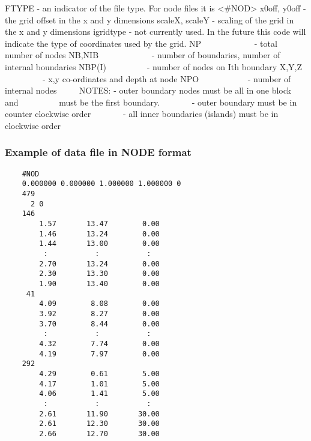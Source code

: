 \documentclass{article}
\begin{document}
\noindent
FTYPE - an indicator of the file type.  For node files it is <\#NOD> \newline
x0off, y0off - the grid offset in the x and y dimensions \newline
scaleX, scaleY - scaling of the grid in the x and y dimensions \newline
igridtype - not currently used.  In the future this code will indicate the type of coordinates used by the grid. \newline
NP \ \ \ \ \ \ \ \ \ \ \ \ {}- total number of nodes\newline
NB,NIB \ \ \ \ \ \ \ \ \ \ \ \ {}- number of boundaries, number of internal boundaries\newline
NBP(I) \ \ \ \ \ \ \ \ \ {}- number of nodes on Ith boundary\newline
X,Y,Z \ \ \ \ \ \ \ \ \ {}- x,y co-ordinates and depth at node\newline
NPO \ \ \ \ \ \ \ \ \ \ \ {}- number of internal nodes\newline
 \ \ \ \ \newline
 NOTES: - outer boundary nodes must be all in one block and\newline
 \ \ \ \ \ \ \ \ \ must be the first boundary.\newline
 \ \ \ \ \ \ \ {}- outer boundary must be in counter clockwise order\newline
 \ \ \ \ \ \ \ {}- all inner boundaries (islands) must be in clockwise order


\newpage
\subsubsection{Example of data file in NODE format}

\begin{small}
\begin{lstlisting}
    #NOD 
    0.000000 0.000000 1.000000 1.000000 0 
    479
      2 0
    146
        1.57       13.47        0.00
        1.46       13.24        0.00
        1.44       13.00        0.00
         :           :           :
        2.70       13.24        0.00
        2.30       13.30        0.00
        1.90       13.40        0.00
     41
        4.09        8.08        0.00
        3.92        8.27        0.00
        3.70        8.44        0.00
         :           :           :
        4.32        7.74        0.00
        4.19        7.97        0.00
    292
        4.29        0.61        5.00
        4.17        1.01        5.00
        4.06        1.41        5.00
         :           :           :
        2.61       11.90       30.00
        2.61       12.30       30.00
        2.66       12.70       30.00
\end{lstlisting}
\end{small}
\end{document}
